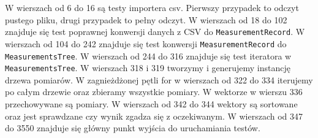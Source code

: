 W wierszach od 6 do 16 są testy importera csv. Pierwszy przypadek to odczyt pustego pliku, drugi przypadek to pełny odczyt.
W wierszach od 18 do 102 znajduje się test poprawnej konwersji danych z CSV do \texttt{MeasurementRecord}.
W wierszach od 104 do 242 znajduje się test konwersji \texttt{MeasurementRecord} do \texttt{MeasurementsTree}.	
W wierszach od 244 do 316 znajduje się test iteratora w \texttt{MeasurementsTree}.
W wierszach 318 i 319 tworzymy i generujemy instancję drzewa pomiarów.
W zagnieżdżonej pętli for w wierszach od 322 do 334 iterujemy po całym drzewie oraz zbieramy wszystkie pomiary.
W wektorze w wierszu 336 przechowywane są pomiary.
W wierszach od 342 do 344 wektory są sortowane oraz jest sprawdzane czy wynik zgadza się z oczekiwanym.
W wierszach od 347 do 3550 znajduje się główny punkt wyjścia do uruchamiania testów.
